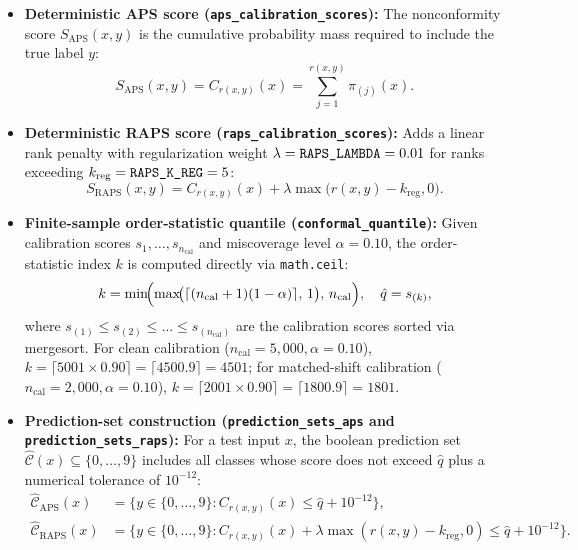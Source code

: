 \documentclass[11pt,a4paper]{article}
\begin{document}
\begin{itemize}
  \item \textbf{Deterministic APS score (\texttt{aps\_\allowbreak{}calibration\_\allowbreak{}scores}):} The nonconformity score $S_{\text{APS}}(x, y)$ is the cumulative probability mass required to include the true label $y$:
  \begin{equation}
    \label{eq:aps_score}
    S_{\text{APS}}(x, y) = C_{r(x, y)}(x) = \sum_{j=1}^{r(x, y)} \pi_{(j)}(x).
  \end{equation}
  \item \textbf{Deterministic RAPS score (\texttt{raps\_\allowbreak{}calibration\_\allowbreak{}scores}):} Adds a linear rank penalty with regularization weight $\lambda = \text{\texttt{RAPS\_\allowbreak{}LAMBDA}} = 0.01$ for ranks exceeding $k_{\text{reg}} = \text{\texttt{RAPS\_\allowbreak{}K\_\allowbreak{}REG}} = 5$:
  \begin{equation}
    \label{eq:raps_score}
    S_{\text{RAPS}}(x, y) = C_{r(x, y)}(x) + \lambda \max\bigl(r(x, y) - k_{\text{reg}}, 0\bigr).
  \end{equation}
  \item \textbf{Finite-sample order-statistic quantile (\texttt{conformal\_\allowbreak{}quantile}):} Given calibration scores $s_1, \dots, s_{n_{\text{cal}}}$ and miscoverage level $\alpha = 0.10$, the order-statistic index $k$ is computed directly via \texttt{math.ceil}:
  \begin{equation}
    \label{eq:conformal_k}
    k = \min\!\Bigl(\max\!\bigl(\lceil (n_{\text{cal}} + 1)(1 - \alpha) \rceil, \, 1\bigr), \, n_{\text{cal}}\Bigr), \quad \hat{q} = s_{(k)},
  \end{equation}
  where $s_{(1)} \le s_{(2)} \le \dots \le s_{(n_{\text{cal}})}$ are the calibration scores sorted via mergesort. For clean calibration ($n_{\text{cal}} = 5{,}000, \alpha = 0.10$), $k = \lceil 5001 \times 0.90 \rceil = \lceil 4500.9 \rceil = 4501$; for matched-shift calibration ($n_{\text{cal}} = 2{,}000, \alpha = 0.10$), $k = \lceil 2001 \times 0.90 \rceil = \lceil 1800.9 \rceil = 1801$.
  \item \textbf{Prediction-set construction (\texttt{prediction\_\allowbreak{}sets\_\allowbreak{}aps} and \texttt{prediction\_\allowbreak{}sets\_\allowbreak{}raps}):} For a test input $x$, the boolean prediction set $\widehat{\mathcal{C}}(x) \subseteq \{0, \dots, 9\}$ includes all classes whose score does not exceed $\hat{q}$ plus a numerical tolerance of $10^{-12}$:
  \begin{align}
    \label{eq:pred_sets}
    \widehat{\mathcal{C}}_{\text{APS}}(x) &= \bigl\{ y \in \{0, \dots, 9\} : C_{r(x, y)}(x) \le \hat{q} + 10^{-12} \bigr\}, \\
    \widehat{\mathcal{C}}_{\text{RAPS}}(x) &= \bigl\{ y \in \{0, \dots, 9\} : C_{r(x, y)}(x) + \lambda \max(r(x, y) - k_{\text{reg}}, 0) \le \hat{q} + 10^{-12} \bigr\}.
  \end{align}
\end{itemize}
\end{document}
